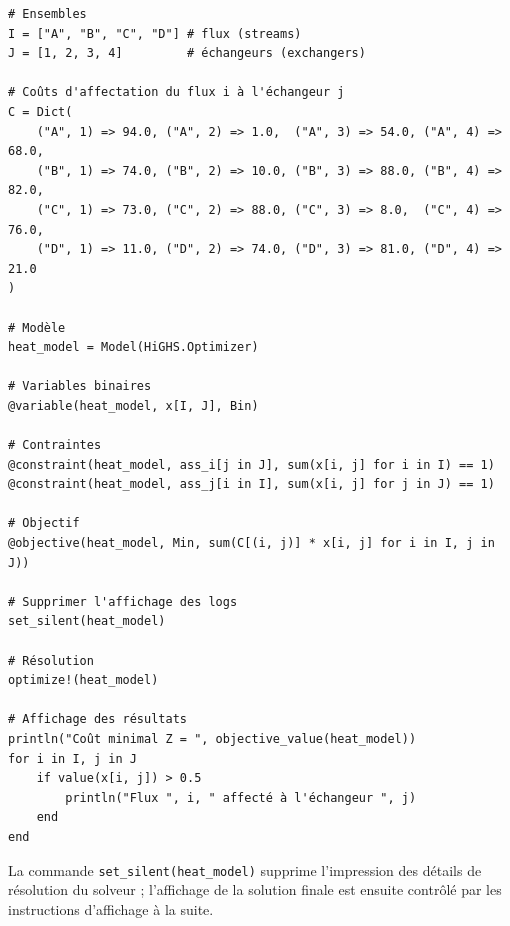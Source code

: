 \begin{example}
\begin{verbatim}
# Ensembles 
I = ["A", "B", "C", "D"] # flux (streams)
J = [1, 2, 3, 4]         # échangeurs (exchangers)

# Coûts d'affectation du flux i à l'échangeur j
C = Dict(
    ("A", 1) => 94.0, ("A", 2) => 1.0,  ("A", 3) => 54.0, ("A", 4) => 68.0,
    ("B", 1) => 74.0, ("B", 2) => 10.0, ("B", 3) => 88.0, ("B", 4) => 82.0,
    ("C", 1) => 73.0, ("C", 2) => 88.0, ("C", 3) => 8.0,  ("C", 4) => 76.0,
    ("D", 1) => 11.0, ("D", 2) => 74.0, ("D", 3) => 81.0, ("D", 4) => 21.0
)

# Modèle
heat_model = Model(HiGHS.Optimizer)

# Variables binaires
@variable(heat_model, x[I, J], Bin)

# Contraintes
@constraint(heat_model, ass_i[j in J], sum(x[i, j] for i in I) == 1)
@constraint(heat_model, ass_j[i in I], sum(x[i, j] for j in J) == 1)

# Objectif
@objective(heat_model, Min, sum(C[(i, j)] * x[i, j] for i in I, j in J))

# Supprimer l'affichage des logs
set_silent(heat_model)

# Résolution
optimize!(heat_model)

# Affichage des résultats
println("Coût minimal Z = ", objective_value(heat_model))
for i in I, j in J
    if value(x[i, j]) > 0.5
        println("Flux ", i, " affecté à l'échangeur ", j)
    end
end
\end{verbatim}
La commande \verb|set_silent(heat_model)| supprime l'impression des détails de résolution du solveur ; l'affichage de la solution finale est ensuite contrôlé par les instructions d'affichage à la suite.
\end{example}

